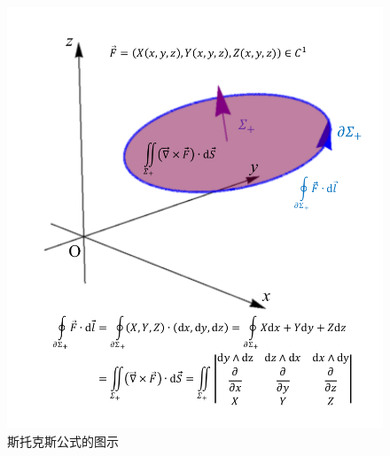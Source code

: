 \documentclass[12pt,UTF8,fleqn]{ctexart}
\begin{document}
\begin{enumerate}
\begin{figure}[H]
\begin{center}
\includegraphics[height=0.618\textheight,angle=0]{Figures20190613/Stokes.pdf}
\end{center}
\caption{斯托克斯公式的图示}
\end{figure}
\end{enumerate}
\end{document}
